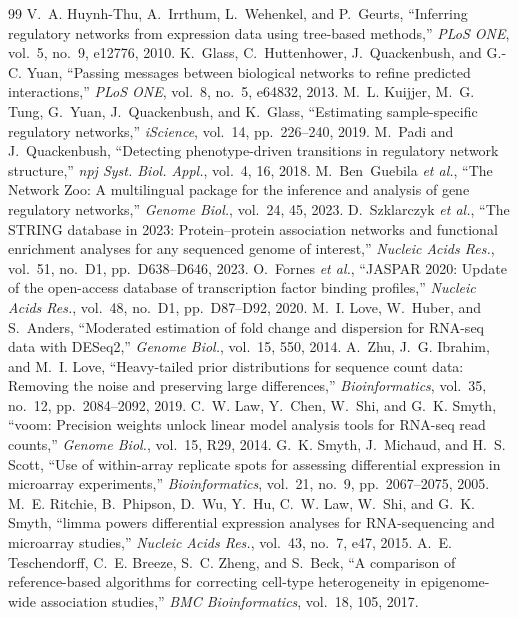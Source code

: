 \documentclass[journal]{IEEEtran}
\begin{document}
\begin{thebibliography}{99}
 V.~A. Huynh-Thu, A.~Irrthum, L.~Wehenkel, and P.~Geurts, ``Inferring regulatory networks from expression data using tree-based methods,'' \emph{PLoS ONE}, vol.~5, no.~9, e12776, 2010.
 K.~Glass, C.~Huttenhower, J.~Quackenbush, and G.-C. Yuan, ``Passing messages between biological networks to refine predicted interactions,'' \emph{PLoS ONE}, vol.~8, no.~5, e64832, 2013.
 M.~L. Kuijjer, M.~G. Tung, G.~Yuan, J.~Quackenbush, and K.~Glass, ``Estimating sample-specific regulatory networks,'' \emph{iScience}, vol.~14, pp.~226--240, 2019.
 M.~Padi and J.~Quackenbush, ``Detecting phenotype-driven transitions in regulatory network structure,'' \emph{npj Syst. Biol. Appl.}, vol.~4, 16, 2018.
 M.~Ben~Guebila \emph{et al.}, ``The Network Zoo: A multilingual package for the inference and analysis of gene regulatory networks,'' \emph{Genome Biol.}, vol.~24, 45, 2023.
 D.~Szklarczyk \emph{et al.}, ``The STRING database in 2023: Protein--protein association networks and functional enrichment analyses for any sequenced genome of interest,'' \emph{Nucleic Acids Res.}, vol.~51, no.~D1, pp.~D638--D646, 2023.
 O.~Fornes \emph{et al.}, ``JASPAR 2020: Update of the open-access database of transcription factor binding profiles,'' \emph{Nucleic Acids Res.}, vol.~48, no.~D1, pp.~D87--D92, 2020.
 M.~I. Love, W.~Huber, and S.~Anders, ``Moderated estimation of fold change and dispersion for RNA-seq data with DESeq2,'' \emph{Genome Biol.}, vol.~15, 550, 2014.
 A.~Zhu, J.~G. Ibrahim, and M.~I. Love, ``Heavy-tailed prior distributions for sequence count data: Removing the noise and preserving large differences,'' \emph{Bioinformatics}, vol.~35, no.~12, pp.~2084--2092, 2019.
 C.~W. Law, Y.~Chen, W.~Shi, and G.~K. Smyth, ``voom: Precision weights unlock linear model analysis tools for RNA-seq read counts,'' \emph{Genome Biol.}, vol.~15, R29, 2014.
 G.~K. Smyth, J.~Michaud, and H.~S. Scott, ``Use of within-array replicate spots for assessing differential expression in microarray experiments,'' \emph{Bioinformatics}, vol.~21, no.~9, pp.~2067--2075, 2005.
 M.~E. Ritchie, B.~Phipson, D.~Wu, Y.~Hu, C.~W. Law, W.~Shi, and G.~K. Smyth, ``limma powers differential expression analyses for RNA-sequencing and microarray studies,'' \emph{Nucleic Acids Res.}, vol.~43, no.~7, e47, 2015.
 A.~E. Teschendorff, C.~E. Breeze, S.~C. Zheng, and S.~Beck, ``A comparison of reference-based algorithms for correcting cell-type heterogeneity in epigenome-wide association studies,'' \emph{BMC Bioinformatics}, vol.~18, 105, 2017.

\end{thebibliography}
\end{document}
